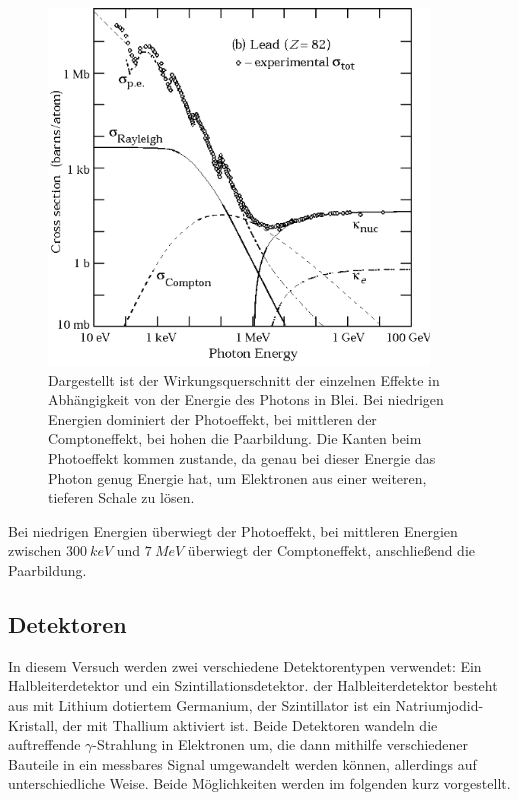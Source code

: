 \begin{figure}[h!]
	\centering
	\includegraphics[width=0.9\textwidth]{streuung.PNG}
	\caption{Dargestellt ist der Wirkungsquerschnitt der einzelnen Effekte in Abhängigkeit von der Energie des Photons in Blei. Bei niedrigen Energien dominiert der Photoeffekt, bei mittleren der Comptoneffekt, bei hohen die Paarbildung. Die Kanten beim Photoeffekt kommen zustande, da genau bei dieser Energie das Photon genug Energie hat, um Elektronen aus einer weiteren, tieferen Schale zu lösen.}
	\label{streuung}
\end{figure}

Bei niedrigen Energien überwiegt der Photoeffekt, bei mittleren Energien zwischen $\SI{300}{keV}$ und $\SI{7}{MeV}$ überwiegt der Comptoneffekt, anschließend die Paarbildung.

\subsection{Detektoren}
In diesem Versuch werden zwei verschiedene Detektorentypen verwendet: Ein Halbleiterdetektor und ein Szintillationsdetektor. der Halbleiterdetektor besteht aus mit Lithium dotiertem Germanium, der Szintillator ist ein Natriumjodid-Kristall, der mit Thallium aktiviert ist. Beide Detektoren wandeln die auftreffende $\gamma$-Strahlung in Elektronen um,  die dann mithilfe verschiedener Bauteile in ein messbares Signal umgewandelt werden können, allerdings auf unterschiedliche Weise. Beide Möglichkeiten werden im folgenden kurz vorgestellt.

